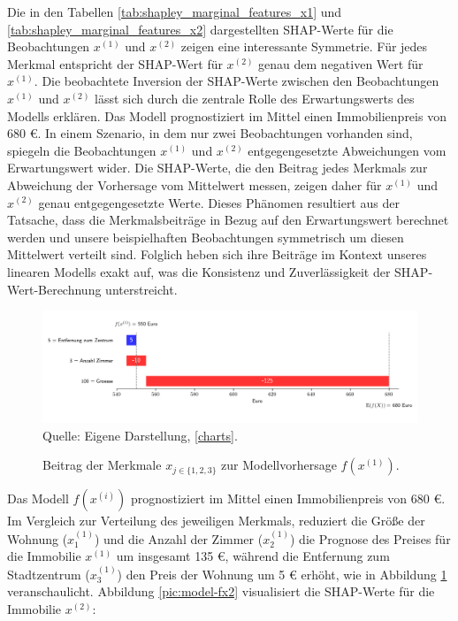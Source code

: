 Die in den Tabellen \ref{tab:shapley_marginal_features_x1} und \ref{tab:shapley_marginal_features_x2} 
dargestellten SHAP-Werte für die Beobachtungen \( x^{(1)} \) und \( x^{(2)} \) zeigen eine interessante Symmetrie. 
Für jedes Merkmal entspricht der SHAP-Wert für \( x^{(2)} \) genau dem negativen Wert für \( x^{(1)} \). 
Die beobachtete Inversion der SHAP-Werte zwischen den Beobachtungen \( x^{(1)} \) und \( x^{(2)} \) 
lässt sich durch die zentrale Rolle des Erwartungswerts des Modells erklären. 
Das Modell prognostiziert im Mittel einen Immobilienpreis von 680 \euro. In einem Szenario, in dem nur zwei 
Beobachtungen vorhanden sind, spiegeln die Beobachtungen \( x^{(1)} \) und \( x^{(2)} \) entgegengesetzte 
Abweichungen vom Erwartungswert wider. Die SHAP-Werte, die den Beitrag jedes Merkmals zur Abweichung 
der Vorhersage vom Mittelwert messen, zeigen daher für \( x^{(1)} \) und \( x^{(2)} \) genau entgegengesetzte Werte. 
Dieses Phänomen resultiert aus der Tatsache, dass die Merkmalsbeiträge in Bezug auf den Erwartungswert 
berechnet werden und unsere beispielhaften Beobachtungen symmetrisch um diesen Mittelwert verteilt sind. 
Folglich heben sich ihre Beiträge im Kontext unseres linearen Modells exakt auf, was die Konsistenz und 
Zuverlässigkeit der SHAP-Wert-Berechnung unterstreicht.


\begin{figure}[!h]
    \caption{Beitrag der Merkmale $x_{j \in \{1, 2, 3\}}$ zur Modellvorhersage $f(x^{(1)})$.}
    \includegraphics[width=1\textwidth]{../scripts/images/model-output-x1.png}
    Quelle: Eigene Darstellung, \ref{charts}.
    \label{pic:model-fx1}
\end{figure}

Das Modell $f(x^{(i)})$
prognostiziert im Mittel einen Immobilienpreis von 680 \euro{}. Im Vergleich zur
Verteilung des jeweiligen Merkmals, reduziert die Größe der 
Wohnung ($x_1^{(1)}$) und die Anzahl der Zimmer ($x_2^{(1)}$) die Prognose 
des Preises für die Immobilie $x^{(1)}$ um insgesamt 135 \euro{}, während die Entfernung zum Stadtzentrum
($x_3^{(1)}$) den Preis der Wohnung um 5 \euro{} erhöht, wie in Abbildung 
\ref{pic:model-fx1} veranschaulicht. Abbildung \ref{pic:model-fx2} visualisiert die SHAP-Werte für die Immobilie $x^{(2)}$:

